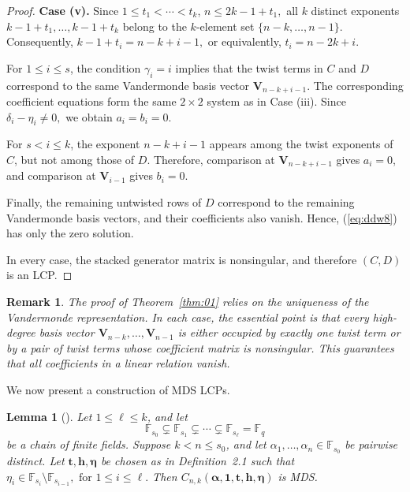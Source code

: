 \documentclass[12pt,draftcls,journal,onecolumn]{IEEEtran}
\newtheorem{lemma}[theorem]{Lemma}
\newtheorem{remark}[theorem]{Remark}
\newcommand{\F}{{\mathbb{F}}}
\begin{document}
\begin{proof}
\medskip
\noindent\textbf{Case (v).}
Since
\(
1\le t_1<\cdots<t_k
\),
\(
n\le 2k-1+t_1,
\)
all \(k\) distinct exponents
\(
k-1+t_1,\ldots,k-1+t_k
\)
belong to the \(k\)-element set
\(
\{n-k,\ldots,n-1\}.
\)
Consequently,
\(
k-1+t_i=n-k+i-1,
\)
or equivalently,
\(
t_i=n-2k+i.
\)

For \(1\le i\le s\), the condition \(\gamma_i=i\) implies that the twist terms in \(C\) and \(D\) correspond to the same Vandermonde basis vector \(\mathbf{V}_{n-k+i-1}\). The corresponding coefficient equations form the same \(2\times2\) system as in Case (iii). Since
\(
\delta_i-\eta_i\ne0,
\) we obtain
\(
a_i=b_i=0.
\)

For \(s<i\le k\), the exponent \(n-k+i-1\) appears among the twist exponents of \(C\), but not among those of \(D\). Therefore, comparison at \(\mathbf{V}_{n-k+i-1}\) gives \(a_i=0\), and comparison at \(\mathbf{V}_{i-1}\) gives \(b_i=0\).

Finally, the remaining untwisted rows of \(D\) correspond to the remaining Vandermonde basis vectors, and their coefficients also vanish. Hence, (\ref{eq:ddw8}) has only the zero solution.

In every case, the stacked generator matrix is nonsingular, and therefore \((C,D)\) is an LCP.
\end{proof}

\begin{remark}
The proof of Theorem~\ref{thm:01} relies on the uniqueness of the
Vandermonde representation. In each case, the essential point is that
every high-degree basis vector
\(
\mathbf{V}_{n-k},\ldots,\mathbf{V}_{n-1}
\)
is either occupied by exactly one twist term or by a pair of twist terms
whose coefficient matrix is nonsingular. This guarantees that all
coefficients in a linear relation vanish.
\end{remark}

We now present a construction of MDS LCPs.

\begin{lemma}[{\cite[Theorem~1]{BeelenEtAl2018}}]\label{lem:kno}
Let \(1\le \ell\le k\), and let
\[
\F_{s_0}\subsetneq\F_{s_1}\subsetneq\cdots\subsetneq\F_{s_\ell}=\F_q
\]
be a chain of finite fields. Suppose \(k<n\le s_0\), and let
\(\alpha_1,\ldots,\alpha_n\in\F_{s_0}\) be pairwise distinct.
Let \(\boldsymbol{t},\mathbf{h},\boldsymbol{\eta}\) be chosen as in
Definition~2.1 such that
\(
\eta_i\in\F_{s_i}\setminus\F_{s_{i-1}},
\text{ for }
1\le i\le\ell.
\)
Then
\(
C_{n,k}(\boldsymbol{\alpha},\boldsymbol{1},\boldsymbol{t},
\mathbf{h},\boldsymbol{\eta})
\)
is MDS.
\end{lemma}
\end{document}
